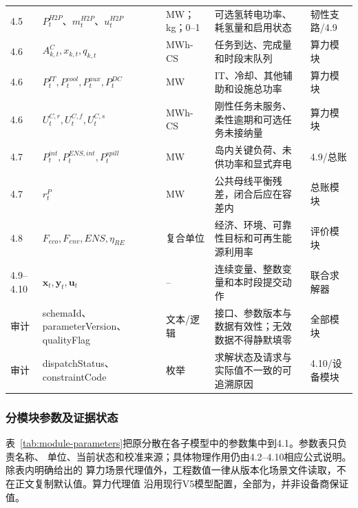 \begin{longtable}{p{1.2cm} p{3.45cm} p{1.55cm} p{5.0cm} p{2.15cm}}
4.5 & $P_t^{H2P}$、$m_t^{H2P}$、$u_t^{H2P}$ & MW；kg；0--1 & 可选氢转电功率、耗氢量和启用状态 & 韧性支路/4.9 \\
4.6 & $A_{k,t}^{C},x_{k,t},q_{k,t}$ & MWh-CS & 任务到达、完成量和时段末队列 & 算力模块 \\
4.6 & $P_t^{IT},P_t^{cool},P_t^{aux},P_t^{DC}$ & MW & IT、冷却、其他辅助和设施总功率 & 算力模块 \\
4.6 & $U_t^{C,r},U_t^{C,f},U_t^{C,s}$ & MWh-CS & 刚性任务未服务、柔性逾期和可选任务未接纳量 & 算力模块 \\
4.7 & $P_t^{int},P_t^{ENS,int},P_t^{spill}$ & MW & 岛内关键负荷、未供功率和显式弃电 & 4.9/总账 \\
4.7 & $r_t^P$ & MW & 公共母线平衡残差，闭合后应在容差内 & 总账模块 \\
4.8 & $F_{eco},F_{env},ENS,\eta_{RE}$ & 复合单位 & 经济、环境、可靠性目标和可再生能源利用率 & 评价模块 \\
4.9--4.10 & $\bm x_t,\bm y_t,\bm u_t$ & -- & 连续变量、整数变量和本时段提交动作 & 联合求解器 \\
审计 & schemaId、parameterVersion、qualityFlag & 文本/逻辑 & 接口、参数版本与数据有效性；无效数据不得静默填零 & 全部模块 \\
审计 & dispatchStatus、constraintCode & 枚举 & 求解状态及请求与实际值不一致的可追溯原因 & 4.10/设备模块 \\
\bottomrule
\end{longtable}
\endgroup
{}

\subsubsection{分模块参数及证据状态}

表~\ref{tab:module-parameters}把原分散在各子模型中的参数集中到4.1。参数表只负责名称、
单位、当前状态和校准来源；具体物理作用仍由4.2--4.10相应公式说明。除表内明确给出的
算力场景代理值外，工程数值一律从版本化场景文件读取，不在正文复制默认值。算力代理值
沿用现行V5模型配置，全部为\assumptiontag，并非设备商保证值。

